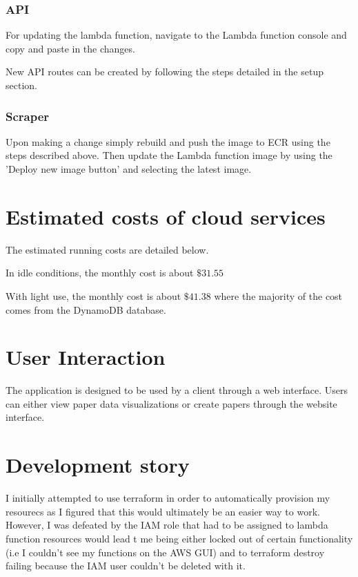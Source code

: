 \documentclass[12pt]{article}
\begin{document}
\subsubsection{API}

For updating the lambda function, navigate to the Lambda function console and copy and paste in the changes.

New API routes can be created by following the steps detailed in the setup section.

\subsubsection{Scraper}

Upon making a change simply rebuild and push the image to ECR using the steps described above. Then update the Lambda function image by using the 'Deploy new image button' and selecting the latest image.

\section{Estimated costs of cloud services}
The estimated running costs are detailed below.

In idle conditions, the monthly cost is about $\$31.55$

With light use, the monthly cost is about $\$41.38$ where the majority of the cost comes from the DynamoDB database.

\section{User Interaction}

The application is designed to be used by a client through a web interface. Users can either view paper data visualizations or create papers through the website interface. 


\section{Development story}

I initially attempted to use terraform in order to automatically provision my resourecs as I figured that this would ultimately be an easier way to work.
However, I was defeated by the IAM role that had to be assigned to lambda function resources would lead t me being either locked out of certain functionality (i.e I couldn't see my functions on the AWS GUI) and to terraform destroy failing because the IAM user couldn't be deleted with it.
\end{document}
